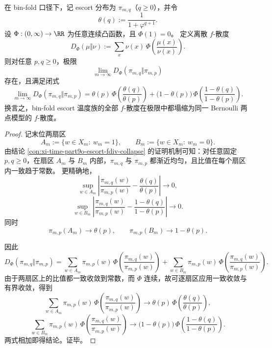 \begin{theorem}\label{thm:conclusion-binfold-escort-full-fdiv-collapse}
在 bin-fold 口径下，记 escort 分布为 \(\pi_{m,q}\)（\(q\ge 0\)），并令
\[
\theta(q):=\frac{1}{1+\varphi^{q+1}}.
\]
设 \(\Phi:(0,\infty)\to\RR\) 为任意连续凸函数，且 \(\Phi(1)=0\)。
定义离散 \(f\)-散度
\[
D_\Phi(\mu\Vert \nu):=\sum_x \nu(x)\,\Phi\!\left(\frac{\mu(x)}{\nu(x)}\right).
\]
则对任意 \(p,q\ge 0\)，极限
\[
\lim_{m\to\infty}D_\Phi(\pi_{m,q}\Vert \pi_{m,p})
\]
存在，且满足闭式
\[
\lim_{m\to\infty}D_\Phi(\pi_{m,q}\Vert \pi_{m,p})
=
\theta(p)\,\Phi\!\left(\frac{\theta(q)}{\theta(p)}\right)
+
\bigl(1-\theta(p)\bigr)\,
\Phi\!\left(\frac{1-\theta(q)}{1-\theta(p)}\right).
\]
换言之，bin-fold escort 温度族的全部 \(f\)-散度在极限中都塌缩为同一 Bernoulli 两点模型的 \(f\)-散度。
\end{theorem}
\begin{proof}
记末位两扇区
\[
A_m:=\{w\in X_m:\ w_m=1\},
\qquad
B_m:=\{w\in X_m:\ w_m=0\}.
\]
由结论 \ref{con:xi-time-part9o-escort-fdiv-collapse} 的证明机制可知：对任意固定 \(p,q\ge 0\)，在扇区 \(A_m\) 与 \(B_m\) 内部，\(\pi_{m,q}\) 与 \(\pi_{m,p}\) 都渐近均匀，且比值在每个扇区内一致趋于常数。
更精确地，
\[
\sup_{w\in A_m}\left|
\frac{\pi_{m,q}(w)}{\pi_{m,p}(w)}
-\frac{\theta(q)}{\theta(p)}
\right|
\to 0,
\]
\[
\sup_{w\in B_m}\left|
\frac{\pi_{m,q}(w)}{\pi_{m,p}(w)}
-\frac{1-\theta(q)}{1-\theta(p)}
\right|
\to 0.
\]
同时
\[
\pi_{m,p}(A_m)\to \theta(p),
\qquad
\pi_{m,p}(B_m)\to 1-\theta(p).
\]

因此
\[
D_\Phi(\pi_{m,q}\Vert \pi_{m,p})
=
\sum_{w\in A_m}\pi_{m,p}(w)\,
\Phi\!\left(\frac{\pi_{m,q}(w)}{\pi_{m,p}(w)}\right)
+
\sum_{w\in B_m}\pi_{m,p}(w)\,
\Phi\!\left(\frac{\pi_{m,q}(w)}{\pi_{m,p}(w)}\right).
\]
由于两扇区上的比值都一致收敛到常数，而 \(\Phi\) 连续，故可逐扇区应用一致收敛与有界收敛，得到
\[
\sum_{w\in A_m}\pi_{m,p}(w)\,
\Phi\!\left(\frac{\pi_{m,q}(w)}{\pi_{m,p}(w)}\right)
\to
\theta(p)\,\Phi\!\left(\frac{\theta(q)}{\theta(p)}\right),
\]
\[
\sum_{w\in B_m}\pi_{m,p}(w)\,
\Phi\!\left(\frac{\pi_{m,q}(w)}{\pi_{m,p}(w)}\right)
\to
\bigl(1-\theta(p)\bigr)\,
\Phi\!\left(\frac{1-\theta(q)}{1-\theta(p)}\right).
\]
两式相加即得结论。证毕。
\end{proof}

